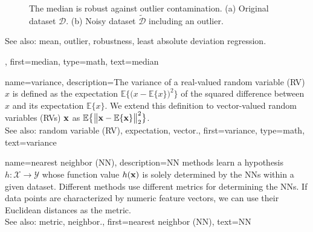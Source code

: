 {{{\begin{figure}[H]
		\caption{The median is robust against outlier contamination. (a) Original dataset $\mathcal{D}$. (b) Noisy 
		dataset $\widetilde{\mathcal{D}}$ including an outlier. \label{fig_median2_dict}}
		\end{figure}
		See also: mean, outlier, robustness, least absolute deviation regression.}, 
	first={median}, 
	type=math,
	text={median} 
}

{name={variance},
	description={The variance of a real-valued random variable (RV) $x$ is defined 
	   as the expectation $\mathbb{E} \big\{ \big( x - \mathbb{E} \{x \} \big)^{2} \big\}$ of 
	   the squared difference between $x$ and its expectation $\mathbb{E} \{x \}$. 
	   We extend this definition to vector-valued random variables (RVs) ${\bf x}$ 
	   as $\mathbb{E} \big\{ \big\| {\bf x} - \mathbb{E} \{{\bf x} \} \big\|_{2}^{2} \big\}$.
					\\ 
		See also: random variable (RV), expectation, vector.},
	first={variance},
	type=math,
	text={variance} 
}

{name={nearest neighbor (NN)},
	description={NN methods learn a hypothesis 
		$h: \mathcal{X} \rightarrow \mathcal{Y}$ whose function value $h({\bf x})$ 
		is solely determined by the NNs within a given dataset. Different 
		methods use different metrics for determining the NNs. If data points 
		are characterized by numeric feature vectors, we can use their Euclidean distances as 
		the metric.
					\\ 
		See also: metric, neighbor.},
	first={nearest neighbor (NN)},
	text={NN} 
}

}
